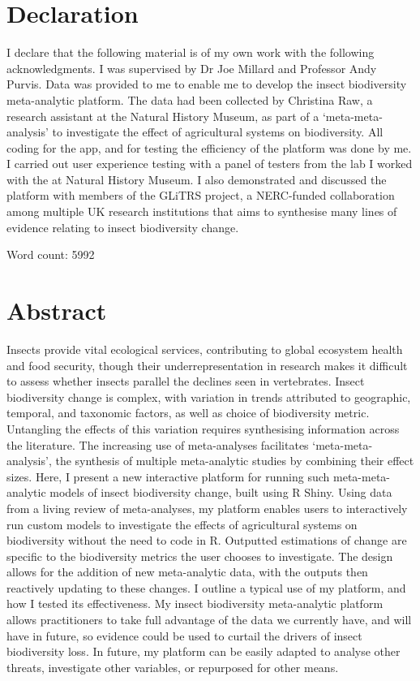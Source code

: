 \documentclass[11pt]{article}
\begin{document}
	\section{Declaration} %
		I declare that the following material is of my own work with the following acknowledgments. I was supervised by Dr Joe Millard and Professor Andy Purvis. Data was provided to me to enable me to develop the insect biodiversity meta-analytic platform. The data had been collected by Christina Raw, a research assistant at the Natural History Museum, as part of a ‘meta-meta-analysis’ to investigate the effect of agricultural systems on biodiversity. All coding for the app, and for testing the efficiency of the platform was done by me. I carried out user experience testing with a panel of testers from the lab I worked with the at Natural History Museum. I also demonstrated and discussed the platform with members of the GLiTRS project, a NERC-funded collaboration among multiple UK research institutions that aims to synthesise many lines of evidence relating to insect biodiversity change. 
		
		\noindent Word count: 5992


	\clearpage 
	
	\section{Abstract}
		Insects provide vital ecological services, contributing to global ecosystem health and food security, though their underrepresentation in research makes it difficult to assess whether insects parallel the declines seen in vertebrates. Insect biodiversity change is complex, with variation in trends attributed to geographic, temporal, and taxonomic factors, as well as choice of biodiversity metric. Untangling the effects of this variation requires synthesising information across the literature. The increasing use of meta-analyses facilitates ‘meta-meta-analysis’, the synthesis of multiple meta-analytic studies by combining their effect sizes. Here, I present a new interactive platform for running such meta-meta-analytic models of insect biodiversity change, built using R Shiny. Using data from a living review of meta-analyses, my platform enables users to interactively run custom models to investigate the effects of agricultural systems on biodiversity without the need to code in R. Outputted estimations of change are specific to the biodiversity metrics the user chooses to investigate. The design allows for the addition of new meta-analytic data, with the outputs then reactively updating to these changes. I outline a typical use of my platform, and how I tested its effectiveness. My insect biodiversity meta-analytic platform allows practitioners to take full advantage of the data we currently have, and will have in future, so evidence could be used to curtail the drivers of insect biodiversity loss. In future, my platform can be easily adapted to analyse other threats, investigate other variables, or repurposed for other means.
\end{document}
